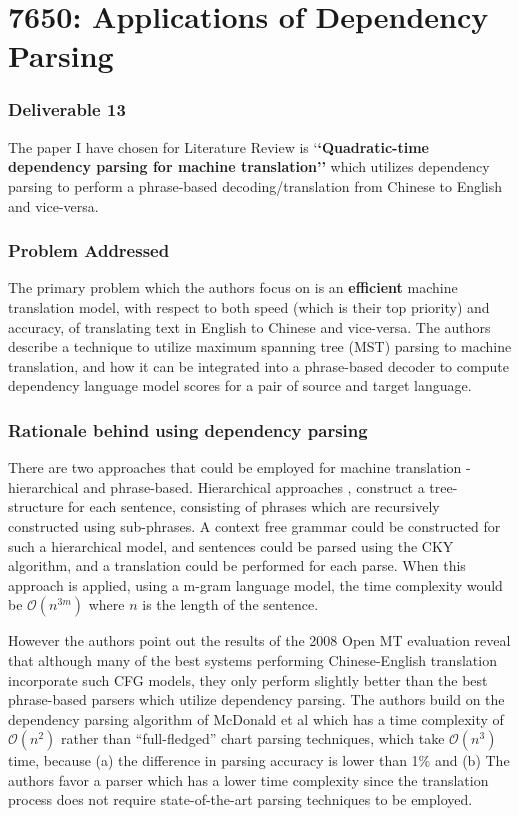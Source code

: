 \documentclass[10pt, letter]{article}
\newcommand{\bigO}{\ensuremath{\mathcal{O}}}
\begin{document}
\section{7650: Applications of Dependency Parsing}
\subsubsection*{Deliverable 13}
The paper I have chosen for Literature Review is `\textbf{`Quadratic-time dependency parsing for machine translation''} \cite{galley2009quadratic} which utilizes dependency parsing to perform a phrase-based decoding/translation from Chinese to English and vice-versa.

\subsubsection*{Problem Addressed}
The primary problem which the authors focus on is an \textbf{efficient} machine translation model, with respect to both speed (which is their top priority) and accuracy, of translating text in English to Chinese and vice-versa. The authors describe a technique to utilize maximum spanning tree (MST) parsing to machine translation, and how it can be integrated into a phrase-based decoder to compute dependency language model scores for a pair of source and target language.
\subsubsection*{Rationale behind using dependency parsing}
There are two approaches that could be employed for machine translation - hierarchical and phrase-based. Hierarchical approaches \cite{chiang2005hierarchical}, construct a tree-structure for each sentence, consisting of phrases which are recursively constructed using sub-phrases. A context free grammar could be constructed for such a hierarchical model, and sentences could be parsed using the CKY algorithm, and a translation could be performed for each parse. When this approach is applied, using a m-gram language model, the time complexity would be $\bigO(n^{3m})$ where $n$ is the length of the sentence.

However the authors point out the results of the 2008 Open MT evaluation reveal that although many of the best systems performing Chinese-English translation incorporate such CFG models, they only perform slightly better than the best phrase-based parsers which utilize dependency parsing. The authors build on the dependency parsing algorithm of McDonald et al \cite{mcdonald2005non} which has a time complexity of $\bigO(n^2)$ rather than ``full-fledged'' chart parsing techniques, which take $\bigO(n^3)$ time, because (a) the difference in parsing accuracy is lower than 1\% and (b) The authors favor a parser which has a lower time complexity since the translation process does not require state-of-the-art parsing techniques to be employed.
\end{document}

